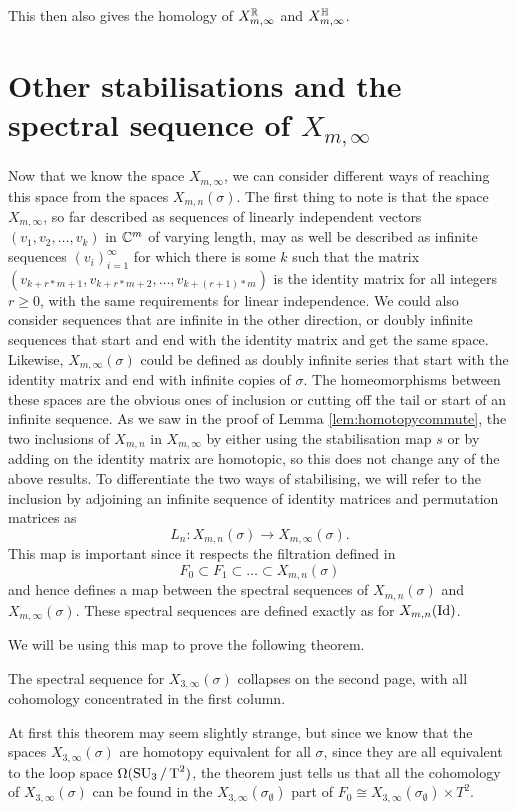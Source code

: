 This then also gives the homology of $X_{m,\infty}^{\mathbb{R}}$ and
$X_{m,\infty}^{\mathbb{H}}$.


\section{Other stabilisations and the spectral sequence of
  $X_{m,\infty}$}
\label{sec:stabilitet}

Now that we know the space $X_{m,\infty}$, we can consider different
ways of reaching this space from the spaces $X_{m,n}(\sigma)$. The
first thing to note is that the space $X_{m,\infty}$, so far described
as sequences of linearly independent vectors $(v_1,v_2,\dots,v_k)$ in
$\mathbb{C}^m$ of varying length, may as well be described as infinite
sequences $(v_i)_{i=1}^\infty$ for which there is some $k$ such that
the matrix $(v_{k+r*m +1},v_{k+r*m +2},\dots,v_{k+(r+1)*m})$ is the
identity matrix for all integers $r \geq 0$, with the same
requirements for
linear independence. We could also consider sequences that are
infinite in the other direction, or
doubly infinite sequences
that start and end with the identity matrix
and get the same space. Likewise, $X_{m,\infty}(\sigma)$ could be
defined as doubly infinite series that start with the identity matrix
and end with infinite copies of $\sigma$. The homeomorphisms between
these spaces are the obvious ones of inclusion or cutting off the tail
or start of an infinite sequence. As we saw in the proof of Lemma
\ref{lem:homotopycommute}, the two inclusions of $X_{m,n}$ in
$X_{m,\infty}$ by either
using the stabilisation map $s$ or by adding on the identity matrix
are homotopic, so this does not change any of the above results. To
differentiate the two ways of stabilising, we will refer to the
inclusion by adjoining an
infinite sequence of identity matrices and permutation matrices as
\[ L_n : X_{m,n}(\sigma) \to X_{m,\infty}(\sigma). \]
This map is important since it respects the
filtration defined in 
\[ F_0 \subset F_1 \subset \dots \subset X_{m,n}(\sigma) \]
and hence defines a map between the spectral sequences of
$X_{m,n}(\sigma)$ and $X_{m,\infty}(\sigma)$. These spectral sequences
are defined exactly as for $X_{m,n}(\operatorname{Id})$.

We will be using this map to prove the following theorem.
\begin{theorem}
  \label{thm:kollaps}
  The spectral sequence for $X_{3,\infty}(\sigma)$ collapses on the
  second page, with all cohomology concentrated in the first column.
\end{theorem}
At first this theorem may seem slightly strange, but since we know
that the spaces $X_{3,\infty}(\sigma)$ are homotopy equivalent for all
$\sigma$, since they are all equivalent to the loop space
$\Omega(\operatorname{SU}_3/\operatorname{T}^2)$, the theorem
just tells us that all the cohomology of $X_{3,\infty}(\sigma)$ can be
found in the $X_{3,\infty}(\sigma_{\emptyset})$ part of $F_0 \cong
X_{3,\infty}(\sigma_{\emptyset})\times T^2$.

